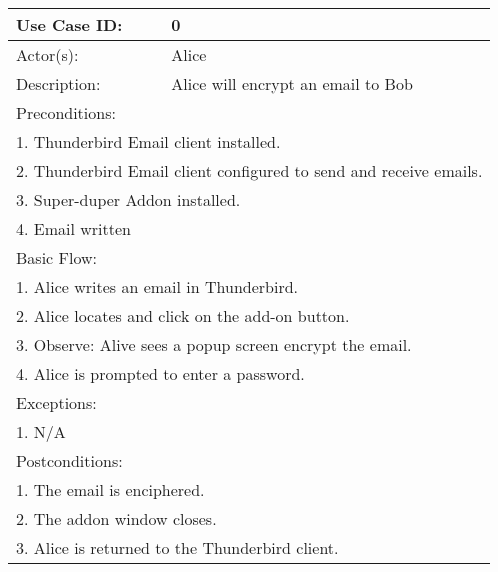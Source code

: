 \begin{longtable} {|p{3cm}|p{9cm}|} %
	\hline
Use Case ID: & 0\\
	\hline
Actor(s): & Alice \\
	\hline
Description: & Alice will encrypt an email to Bob \\
	\hline
	\multicolumn{2}{|l|}{Preconditions:} \\
	\multicolumn{2}{|l|}{1. Thunderbird Email client installed.} \\
	\multicolumn{2}{|l|}{2. Thunderbird Email client configured to send and receive emails.}\\
	\multicolumn{2}{|l|}{3. Super-duper Addon installed.} \\
	\multicolumn{2}{|l|}{4. Email written} \\
	\hline
	\multicolumn{2}{|l|}{Basic Flow:} \\
	\multicolumn{2}{|l|}{1. Alice writes an email in Thunderbird.}\\
	\multicolumn{2}{|l|}{2. Alice locates and click on the add-on button.} \\
	\multicolumn{2}{|l|}{3. Observe: Alive sees a popup screen encrypt the email.} \\
	\multicolumn{2}{|l|}{4. Alice is prompted to enter a password.}\\
	\hline
	\hline
	\multicolumn{2}{|l|}{Exceptions:} \\
	\multicolumn{2}{|l|}{1. N/A} \\
	\hline
	\hline
	\multicolumn{2}{|l|}{Postconditions:} \\
	\multicolumn{2}{|l|}{1. The email is enciphered.} \\
	\multicolumn{2}{|l|}{2. The addon window closes.} \\
	\multicolumn{2}{|l|}{3. Alice is returned to the Thunderbird client.} \\
	\hline
\end{longtable}

